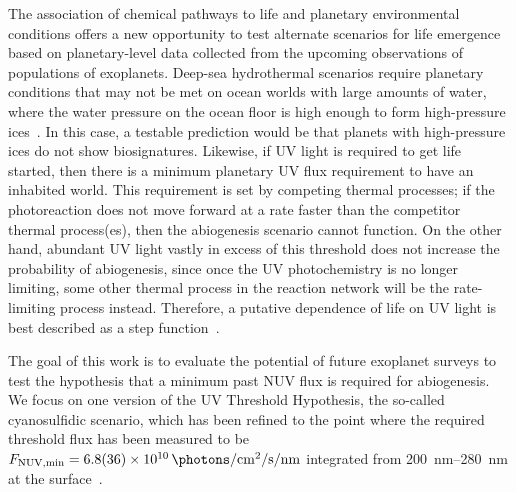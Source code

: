 \documentclass[twocolumn,twocolappendix,linenumbers]{aastex631}
\begin{document}
The association of chemical pathways to life and planetary environmental conditions offers a new opportunity to test alternate scenarios for life emergence based on planetary-level data collected from the upcoming observations of populations of exoplanets.
Deep-sea hydrothermal scenarios require planetary conditions that may not be met on ocean worlds with large amounts of water, where the water pressure on the ocean floor is high enough to form high-pressure ices~\citep{Noack2016,Kite2018}.  %
In this case, a testable prediction would be that planets with high-pressure ices do not show biosignatures.
Likewise, if \gls{UV} light is required to get life started, then there is a minimum planetary \gls{UV} flux requirement to have an inhabited world.
This requirement is set by competing thermal processes; if the photoreaction does not move forward at a rate faster than the competitor thermal process(es), then the abiogenesis scenario cannot function.
On the other hand, abundant \gls{UV} light vastly in excess of this threshold does not increase the probability of abiogenesis, since once the \gls{UV} photochemistry is no longer limiting, some other thermal process in the reaction network will be the rate-limiting process instead.
Therefore, a putative dependence of life on \gls{UV} light is best described as a step function~\citep[e.g.,][]{Ranjan2017c,Rimmer2018,Rimmer2021}.

The goal of this work is to evaluate the potential of future exoplanet surveys to test the hypothesis that a minimum past NUV flux is required for abiogenesis.
We focus on one version of the UV Threshold Hypothesis, the so-called cyanosulfidic scenario, which has been refined to the point where the required threshold flux has been measured to be $F_\mathrm{NUV, min} = \SI{6.8\pm3.6 e10}{\photons\per\centi\meter\squared\per\second\per\nano\meter}$ integrated from \SIrange{200}{280}{\nano\meter} at the surface~\citep{Rimmer2018,Rimmer2021a,Rimmer2023,Ranjan2023a}.
\end{document}
